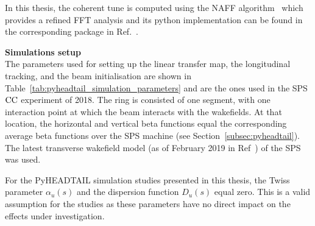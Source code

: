 In this thesis, the coherent tune is computed using the NAFF algorithm~\cite{LASKAR1990266, Kostoglou:2289645} which provides a refined FFT analysis and its python implementation can be found in the corresponding package in Ref.~\cite{nafflib_repository}.


\textbf{Simulations setup}\\
The parameters used for setting up the linear transfer map, the longitudinal tracking, and the beam initialisation are shown in Table~\ref{tab:pyheadtail_simulation_parameters} and are the ones used in the SPS ${\mathrm{CC}}$ experiment of 2018. The ring is consisted of one segment, with one interaction point at which the beam interacts with the wakefields. At that location, the horizontal and vertical beta functions equal the corresponding average beta functions over the SPS machine (see Section~\ref{subsec:pyheadtail}). The latest transverse wakefield model (as of February 2019 in Ref~\cite{sps_impedance_model_git}) of the SPS was used.

For the PyHEADTAIL simulation studies presented in this thesis, the Twiss parameter $\alpha_u(s)$ and the dispersion function $D_u(s)$ equal zero. This is a valid assumption for the studies as these parameters have no direct impact on the effects under investigation.


